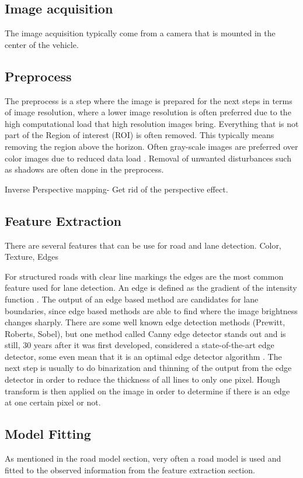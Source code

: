 \subsection{Image acquisition}
The image acquisition typically come from a camera that is mounted in the center of the vehicle. 
\subsection{Preprocess}
The preprocess is a step where the image is prepared for the next steps in terms of image resolution, where a lower image resolution is often preferred due to the high computational load that high resolution images bring. Everything that is not part of the Region of interest (ROI) is often removed. This typically means removing the region above the horizon. Often gray-scale images are preferred over color images due to reduced data load \cite{Yenikaya:2013:KVR:2522968.2522970}. Removal of unwanted disturbances such as shadows are often done in the preprocess. 


Inverse Perspective mapping- Get rid of the perspective effect. 

\subsection{Feature Extraction}
There are several features that can be use for road and lane detection. Color, Texture, Edges

For structured roads with clear line markings the edges are the most common feature used for lane detection. An edge is defined as the gradient of the intensity function \cite{Yenikaya:2013:KVR:2522968.2522970}. The output of an edge based method are candidates for lane boundaries, since edge based methods are able to find where the image brightness changes sharply. There are some well known edge detection methods (Prewitt, Roberts, Sobel), but one method called Canny edge detector stands out and is still, 30 years after it was first developed, considered a state-of-the-art edge detector, some even mean that it is an optimal edge detector algorithm \cite{bhadauria2013comparison}. The next step is usually to do binarization and thinning of the output from the edge detector in order to reduce the thickness of all lines to only one pixel. Hough transform is then applied on the image in order to determine if there is an edge at one certain pixel or not. 


\subsection{Model Fitting}
As mentioned in the road model section, very often a road model is used and fitted to the observed information from the feature extraction section. 

